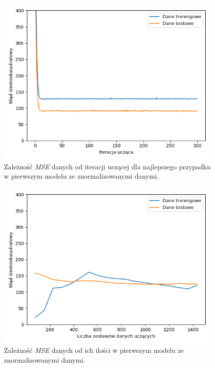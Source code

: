 \documentclass[12pt]{aghdpl}
\newenvironment{tightcenter}{
  \setlength\topsep{0pt}
  \setlength\parskip{0pt}
  \begin{center}
}{
  \end{center}
}
\begin{document}
		\begin{figure}[h]
			\begin{tightcenter}
	 			\includegraphics[width = 0.75\linewidth]{wykresy/2_normalizacja_danych/wykres_uczenia.png}
	 		\end{tightcenter}
	 		
 			\caption{Zależność \textit{MSE} danych od iteracji uczącej dla najlepszego przypadku w pierwszym modelu ze znormalizowanymi danymi.}
			\label{fig: pierwszy_model_wykres_uczenia_z_normalizacja}
		\end{figure}
		
		\begin{figure}[h]
			\begin{tightcenter}
	 			\includegraphics[width = 0.75\linewidth]{wykresy/2_normalizacja_danych/learning_curves.png}
	 		\end{tightcenter}
	 		
 			\caption{Zależność \textit{MSE} danych od ich ilości w pierwszym modelu ze znormalizowanymi danymi.}
			\label{fig: pierwszy_model_learning_curves_z_normalizacja}
		\end{figure}
		
\end{document}
